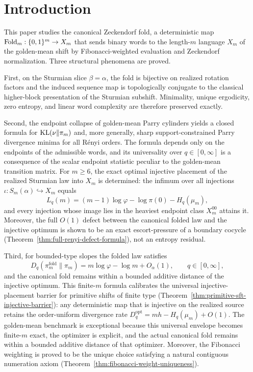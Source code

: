\section{Introduction}\label{sec:introduction}

This paper studies the canonical Zeckendorf fold, a deterministic map
$\mathrm{Fold}_m:\{0,1\}^m\to X_m$ that sends binary words to the length-$m$
language $X_m$ of the golden-mean shift by Fibonacci-weighted evaluation and
Zeckendorf normalization. Three structural phenomena are proved.

First, on the Sturmian slice $\beta=\alpha$, the fold is bijective on
realized rotation factors and the induced sequence map is topologically
conjugate to the classical higher-block presentation of the Sturmian
subshift. Minimality, unique ergodicity, zero entropy, and linear word
complexity are therefore preserved exactly.

Second, the endpoint collapse of golden-mean Parry cylinders yields a closed
formula for $\operatorname{KL}(\nu\|\pi_m)$ and, more generally, sharp
support-constrained Parry divergence minima for all R\'enyi orders. The
formula depends only on the endpoints of the admissible words, and its
universality over $q\in[0,\infty]$ is a consequence of the scalar
endpoint statistic peculiar to the golden-mean transition matrix. For
$m\ge 6$, the exact optimal injective placement of the realized Sturmian
law into $X_m$ is determined: the infimum over all injections
$\iota:S_m(\alpha)\hookrightarrow X_m$ equals
\[
L_q(m)=(m-1)\log\varphi-\log\pi(0)-H_q(\mu_m),
\]
and every injection whose image lies in the heaviest endpoint class
$X_m^{00}$ attains it. Moreover, the full $O(1)$ defect between the
canonical folded law and the injective optimum is shown to be an exact
escort-pressure of a boundary cocycle
(Theorem~\ref{thm:full-renyi-defect-formula}), not an entropy residual.

Third, for bounded-type slopes the folded law satisfies
\[
D_q(\pi_m^{\mathrm{fold}}\|\pi_m)
=m\log\varphi-\log m+O_\alpha(1),
\qquad q\in[0,\infty],
\]
and the canonical fold remains within a bounded additive distance of the
injective optimum. This finite-$m$ formula calibrates the universal
injective-placement barrier for primitive shifts of finite type
(Theorem~\ref{thm:primitive-sft-injective-barrier}): any deterministic map
that is injective on the realized source retains the order-uniform
divergence rate $D_q^{\mathrm{opt}}=mh-H_q(\mu_m)+O(1)$. The golden-mean
benchmark is exceptional because this universal envelope becomes finite-$m$
exact, the optimizer is explicit, and the actual canonical fold remains
within a bounded additive distance of that optimizer. Moreover, the
Fibonacci weighting is proved to be the unique choice satisfying a natural
contiguous numeration axiom (Theorem~\ref{thm:fibonacci-weight-uniqueness}).

